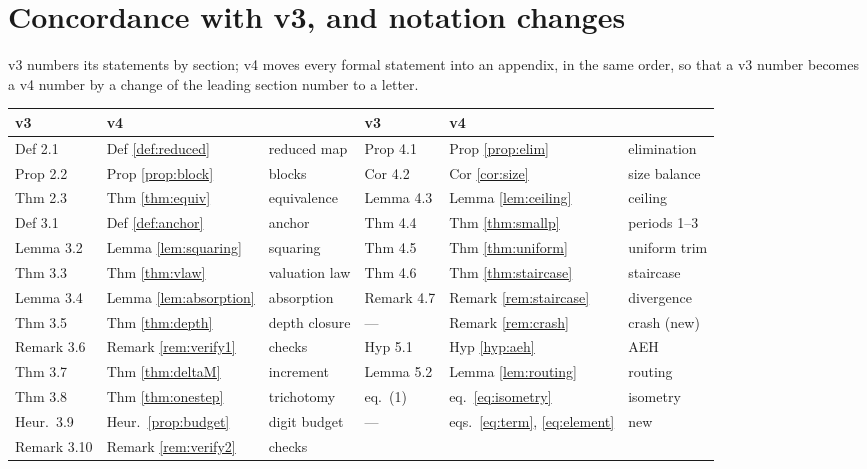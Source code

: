\documentclass[11pt]{article}
\theoremstyle{remark}
\begin{document}
\section{Concordance with v3, and notation changes}\label{app:concordance}

v3 numbers its statements by section; v4 moves every formal statement into an appendix, in the same order, so that a v3 number becomes a v4 number by a change of the leading section number to a letter.

\begin{center}
\small
\begin{tabular}{lll@{\qquad}lll}
\hline
v3 & v4 & & v3 & v4 & \\
\hline
Def 2.1 & Def \ref{def:reduced} & reduced map & Prop 4.1 & Prop \ref{prop:elim} & elimination \\
Prop 2.2 & Prop \ref{prop:block} & blocks & Cor 4.2 & Cor \ref{cor:size} & size balance \\
Thm 2.3 & Thm \ref{thm:equiv} & equivalence & Lemma 4.3 & Lemma \ref{lem:ceiling} & ceiling \\
Def 3.1 & Def \ref{def:anchor} & anchor & Thm 4.4 & Thm \ref{thm:smallp} & periods 1--3 \\
Lemma 3.2 & Lemma \ref{lem:squaring} & squaring & Thm 4.5 & Thm \ref{thm:uniform} & uniform trim \\
Thm 3.3 & Thm \ref{thm:vlaw} & valuation law & Thm 4.6 & Thm \ref{thm:staircase} & staircase \\
Lemma 3.4 & Lemma \ref{lem:absorption} & absorption & Remark 4.7 & Remark \ref{rem:staircase} & divergence \\
Thm 3.5 & Thm \ref{thm:depth} & depth closure & --- & Remark \ref{rem:crash} & crash (new) \\
Remark 3.6 & Remark \ref{rem:verify1} & checks & Hyp 5.1 & Hyp \ref{hyp:aeh} & AEH \\
Thm 3.7 & Thm \ref{thm:deltaM} & increment & Lemma 5.2 & Lemma \ref{lem:routing} & routing \\
Thm 3.8 & Thm \ref{thm:onestep} & trichotomy & eq.\ (1) & eq.\ \eqref{eq:isometry} & isometry \\
Heur.\ 3.9 & Heur.\ \ref{prop:budget} & digit budget & --- & eqs.\ \eqref{eq:term}, \eqref{eq:element} & new \\
Remark 3.10 & Remark \ref{rem:verify2} & checks & & & \\
\hline
\end{tabular}
\end{center}
\end{document}
